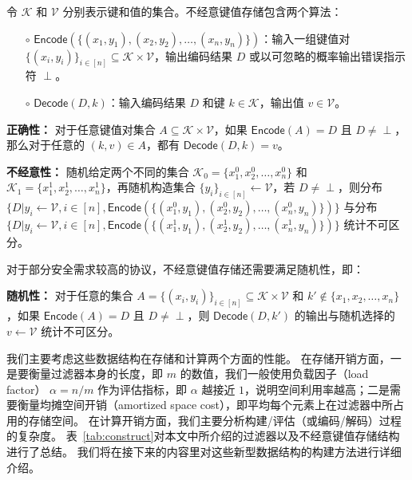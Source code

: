 \begin{definition}[不经意键值存储]\label{def:okvs}
    令 $\mathcal{K}$ 和 $\mathcal{V}$ 分别表示键和值的集合。不经意键值存储包含两个算法：
    \begin{itemize}
        \item[$\circ$] $\mathsf{Encode}(\{(x_1, y_1), (x_2, y_2), \dots, (x_n, y_n)\})$：输入一组键值对 $\{(x_i, y_i)\}_{i\in [n]}\subseteq \mathcal{K} \times \mathcal{V}$，输出编码结果 $D$ 或以可忽略的概率输出错误指示符 $\perp$。
        \item[$\circ$] $\mathsf{Decode}(D, k)$：输入编码结果 $D$ 和键 $k\in \mathcal{K}$，输出值 $v\in \mathcal{V}$。
    \end{itemize}

    \textbf{正确性：} 对于任意键值对集合 $A\subseteq \mathcal{K}\times \mathcal{V}$，如果 $\mathsf{Encode}(A) = D$ 且 $D\neq \perp$，那么对于任意的 $(k, v) \in A$，都有 $\mathsf{Decode}(D, k) = v$。

    \textbf{不经意性：} 随机给定两个不同的集合 $\mathcal{K}_0 = \{x_1^0, x_2^0, \dots, x_n^0\}$ 和 $\mathcal{K}_1 = \{x_1^1, x_2^1, \dots, x_n^1\}$，再随机构造集合 $\{y_i\}_{i\in [n]}\gets \mathcal{V}$，若 $D \neq \perp$，则分布 $\{D | y_i \gets \mathcal{V}, i\in [n], \mathsf{Encode}(\{(x_1^0, y_1), (x_2^0, y_2), \dots, (x_n^0, y_n)\})\}$ 与分布 $\{D | y_i \gets \mathcal{V}, i\in [n], \mathsf{Encode}(\{(x_1^1, y_1), (x_2^1, y_2), \dots, (x_n^1, y_n)\})\}$ 统计不可区分。

    对于部分安全需求较高的协议，不经意键值存储还需要满足随机性，即：

    \textbf{随机性：} 对于任意的集合 $A = \{(x_i, y_i)\}_{i\in [n]} \subseteq \mathcal{K} \times \mathcal{V}$ 和 $k' \notin \{x_1, x_2, \dots, x_n\}$，如果 $\mathsf{Encode}(A) = D$ 且 $D\neq \perp$，则 $\mathsf{Decode}(D, k')$ 的输出与随机选择的 $v\gets \mathcal{V}$ 统计不可区分。
\end{definition}

我们主要考虑这些数据结构在存储和计算两个方面的性能。
在存储开销方面，一是要衡量过滤器本身的长度，即 $m$ 的数值，我们一般使用负载因子（load factor） $\alpha = n/m$ 作为评估指标，即 $\alpha$ 越接近 $1$，说明空间利用率越高；二是需要衡量均摊空间开销（amortized space cost），即平均每个元素上在过滤器中所占用的存储空间。
在计算开销方面，我们主要分析构建/评估（或编码/解码）过程的复杂度。
表~\ref{tab:construct}对本文中所介绍的过滤器以及不经意键值存储结构进行了总结。
我们将在接下来的内容里对这些新型数据结构的构建方法进行详细介绍。

